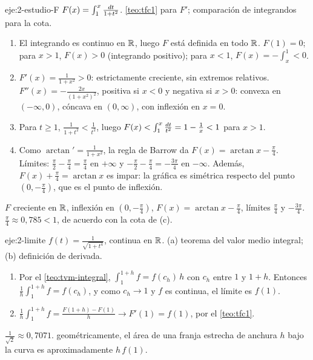 \begin{solucion}{eje:2-estudio-F}
\datos $F(x)=\int_1^{x}\frac{\mathop{}\!d t}{1+t^{2}}$.
\planteamiento \cref{teo:tfc1} para $F'$; comparación de integrandos para la cota.
\pasos
\begin{enumerate}[label=(\alph*)]
  \item El integrando es continuo en $\mathbb{R}$, luego $F$ está definida en todo $\mathbb{R}$. $F(1)=0$; para $x>1$, $F(x)>0$ (integrando positivo); para $x<1$, $F(x)=-\int_x^{1}<0$.
  \item $F'(x)=\frac{1}{1+x^{2}}>0$: estrictamente creciente, sin extremos relativos. $F''(x)=-\frac{2x}{(1+x^{2})^{2}}$, positiva si $x<0$ y negativa si $x>0$: convexa en $(-\infty,0)$, cóncava en $(0,\infty)$, con inflexión en $x=0$.
  \item Para $t\ge1$, $\frac{1}{1+t^{2}}<\frac{1}{t^{2}}$, luego $F(x)<\int_1^{x}\frac{\mathop{}\!d t}{t^{2}}=1-\frac1x<1$ para $x>1$.
  \item Como $\arctan'=\frac{1}{1+x^{2}}$, la regla de Barrow da $F(x)=\arctan x-\frac\pi4$. Límites: $\frac\pi2-\frac\pi4=\frac\pi4$ en $+\infty$ y $-\frac\pi2-\frac\pi4=-\frac{3\pi}{4}$ en $-\infty$. Además, $F(x)+\frac\pi4=\arctan x$ es impar: la gráfica es simétrica respecto del punto $(0,-\frac\pi4)$, que es el punto de inflexión.
\end{enumerate}
\resultado $F$ creciente en $\mathbb{R}$, inflexión en $(0,-\frac\pi4)$, $F(x)=\arctan x-\frac\pi4$, límites $\frac\pi4$ y $-\frac{3\pi}{4}$.
\comprobacion $\frac\pi4\approx0{,}785<1$, de acuerdo con la cota de (c).
\end{solucion}

\begin{solucion}{eje:2-limite}
\datos $f(t)=\frac{1}{\sqrt{1+t^{4}}}$, continua en $\mathbb{R}$.
\planteamiento (a) teorema del valor medio integral; (b) definición de derivada.
\pasos
\begin{enumerate}[label=(\alph*)]
  \item Por el \cref{teo:tvm-integral}, $\int_1^{1+h}f=f(c_h)\,h$ con $c_h$ entre $1$ y $1+h$. Entonces $\frac1h\int_1^{1+h}f=f(c_h)$, y como $c_h\to1$ y $f$ es continua, el límite es $f(1)$.
  \item $\frac1h\int_1^{1+h}f=\frac{F(1+h)-F(1)}{h}\to F'(1)=f(1)$, por el \cref{teo:tfc1}.
\end{enumerate}
\resultado $\frac{1}{\sqrt2}\approx0{,}7071$.
\comprobacion geométricamente, el área de una franja estrecha de anchura $h$ bajo la curva es aproximadamente $h\,f(1)$.
\end{solucion}


